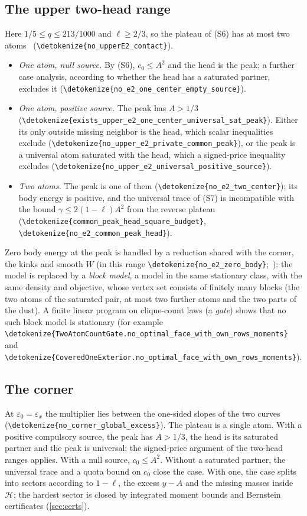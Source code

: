 \documentclass[10pt]{article}
\theoremstyle{definition}
\theoremstyle{remark}
\numberwithin{equation}{section}
\newcommand{\eps}{\varepsilon}
\newcommand{\Hole}{\mathcal{H}}
\newcommand{\leanid}[1]{\expandafter\nolinkurl\expandafter{\detokenize{#1}}}
\newcommand{\Fm}[1]{\cite[#1]{Formalization}}
\begin{document}
\subsection{The upper two-head range}\label{sec:upperE2}
Here $1/5\le q\le213/1000$ and $\ell\ge2/3$, so the plateau of (S6) has at most two atoms~\Fm{\S10.3} (\leanid{no_upperE2_contact}).
\begin{itemize}[leftmargin=1.5em]
\item \emph{One atom, null source.} By (S6), $c_0\le A^2$ and the head is the peak; a further case analysis, according to whether the head has a saturated partner, excludes it (\leanid{no_e2_one_center_empty_source}).
\item \emph{One atom, positive source.} The peak has $A>1/3$ (\leanid{exists_upper_e2_one_center_universal_sat_peak}). Either its only outside missing neighbor is the head, which scalar inequalities exclude (\leanid{no_upper_e2_private_common_peak}), or the peak is a universal atom saturated with the head, which a signed-price inequality excludes (\leanid{no_upper_e2_universal_positive_source}).
\item \emph{Two atoms.} The peak is one of them (\leanid{no_e2_two_center}); its body energy is positive, and the universal trace of (S7) is incompatible with the bound $\gamma\le2(1-\ell)A^2$ from the reverse plateau (\leanid{common_peak_head_square_budget}, \leanid{no_e2_common_peak_head}).
\end{itemize}
Zero body energy at the peak is handled by a reduction shared with the corner, the kinks and smooth $W$ (in this range \leanid{no_e2_zero_body};~\Fm{\S10.0}): the model is replaced by a \emph{block model}, a model in the same stationary class, with the same density and objective, whose vertex set consists of finitely many blocks (the two atoms of the saturated pair, at most two further atoms and the two parts of the dust). A finite linear program on clique-count laws (a \emph{gate}) shows that no such block model is stationary (for example \leanid{TwoAtomCountGate.no_optimal_face_with_own_rows_moments} and \leanid{CoveredOneExterior.no_optimal_face_with_own_rows_moments}).

\subsection{The corner}\label{sec:corner}
At $\eps_0=\eps_x$ the multiplier lies between the one-sided slopes of the two curves~\Fm{\S10.6} (\leanid{no_corner_global_excess}). The plateau is a single atom. With a positive compulsory source, the peak has $A>1/3$, the head is its saturated partner and the peak is universal; the signed-price argument of the two-head ranges applies. With a null source, $c_0\le A^2$. Without a saturated partner, the universal trace and a quota bound on $c_0$ close the case. With one, the case splits into sectors according to $1-\ell$, the excess $y-A$ and the missing masses inside $\Hole$; the hardest sector is closed by integrated moment bounds and Bernstein certificates (\cref{sec:certs}).
\end{document}
